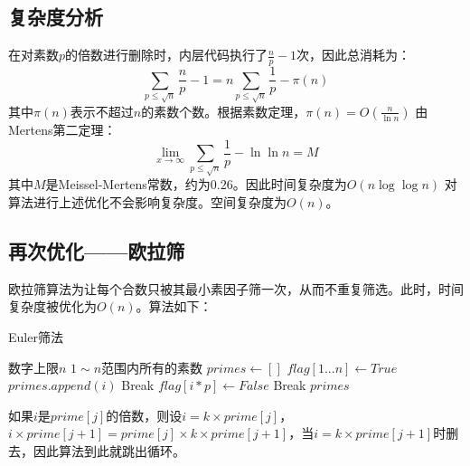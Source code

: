 \documentclass[11pt]{ctexart}
\begin{document}
\subsection{复杂度分析}
在对素数$p$的倍数进行删除时，内层代码执行了$\frac{n}{p} - 1$次，因此总消耗为：
$$\sum_{p \leqslant \sqrt n} \frac{n}{p} - 1 = n\sum_{p \leqslant \sqrt n} \frac{1}{p} - \pi(n)$$
其中$\pi(n)$表示不超过$n$的素数个数。根据素数定理，$\pi(n) = O(\frac{n}{\ln n})$
由Mertens第二定理：
$$\lim_{x \to \infty}\sum_{p \leqslant \sqrt n}\frac{1}{p} - \ln \ln n = M$$
其中$M$是Meissel-Mertens常数，约为$0.26$。因此时间复杂度为$O(n\log \log n)$
对算法进行上述优化不会影响复杂度。空间复杂度为$O(n)$。
\newpage
\subsection{再次优化——欧拉筛}
欧拉筛算法为让每个合数只被其最小素因子筛一次，从而不重复筛选。此时，时间复杂度被优化为$O(n)$。算法如下：
\begin{algorithm}  
    \caption{Euler筛法}  
    \begin{algorithmic}[1] %
        \Require 数字上限$n$  
        \Ensure $1 \sim n$范围内所有的素数  
            \State $primes \gets []$ 
            \State $flag[1...n] \gets {True}$  
                    \State $primes.append(i)$
                \EndIf
                        \State Break
                    \EndIf
                    \State $flag[i * p] \gets False$
                        \State Break
                    \EndIf
                \EndFor
            \EndFor
            \State \Return $primes$
        \EndFunction  
    \end{algorithmic}  
\end{algorithm} 
如果$i$是$prime[j]$的倍数，则设$i = k \times prime[j]$，$i \times prime[j + 1] = prime[j] \times k \times prime[j + 1]$，当$i = k \times prime[j + 1]$时删去，因此算法到此就跳出循环。
\newpage{}
\end{document}
